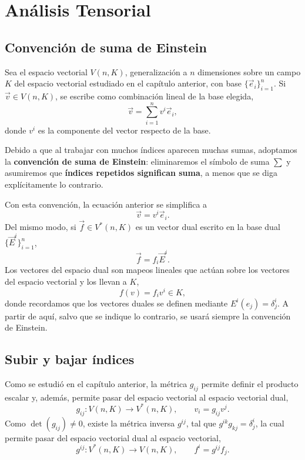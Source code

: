 \chapter{Análisis Tensorial}

\section{Convención de suma de Einstein}

Sea el espacio vectorial $V(n,K)$, generalización a $n$ dimensiones sobre
un campo $K$ del espacio vectorial estudiado en el capítulo anterior, con
base $\{\vec e_i\}_{i=1}^n$. Si $\vec v\in V(n,K)$, se escribe como
combinación lineal de la base elegida,
\[
\vec v = \sum_{i=1}^{n} v^i \vec e_i,
\]
donde $v^i$ es la componente del vector respecto de la base.

\begin{definicion}
Debido a que al trabajar con muchos índices aparecen muchas sumas,
adoptamos la \textbf{convención de suma de Einstein}: eliminaremos el
símbolo de suma $\sum$ y asumiremos que \textbf{índices repetidos
significan suma}, a menos que se diga explícitamente lo contrario.
\end{definicion}

Con esta convención, la ecuación anterior se simplifica a
\[
\vec v = v^i \vec e_i .
\]
Del mismo modo, si $\vec f \in V^*(n,K)$ es un vector dual escrito en la
base dual $\{\vec E^i\}_{i=1}^n$,
\[
\vec f = f_i \vec E^i .
\]
Los vectores del espacio dual son mapeos lineales que actúan sobre los
vectores del espacio vectorial y los llevan a $K$,
\[
f(v) = f_i v^i \in K,
\]
donde recordamos que los vectores duales se definen mediante
$E^i(e_j)=\delta^i_j$. A partir de aquí, salvo que se indique lo
contrario, se usará siempre la convención de Einstein.

\section{Subir y bajar índices}

Como se estudió en el capítulo anterior, la métrica $g_{ij}$ permite
definir el producto escalar y, además, permite pasar del espacio
vectorial al espacio vectorial dual,
\[
g_{ij} : V(n,K) \longrightarrow V^*(n,K), \qquad v_i = g_{ij} v^j .
\]
Como $\det(g_{ij})\neq 0$, existe la métrica inversa $g^{ij}$, tal que
$g^{ik}g_{kj}=\delta^i_j$, la cual permite pasar del espacio vectorial
dual al espacio vectorial,
\[
g^{ij} : V^*(n,K) \longrightarrow V(n,K), \qquad f^i = g^{ij} f_j .
\]

